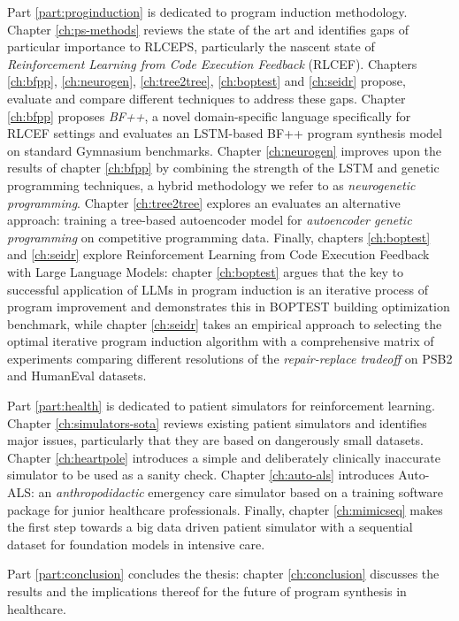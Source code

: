 Part \ref{part:proginduction} is dedicated to program induction methodology.
Chapter \ref{ch:ps-methods} reviews the state of the art and identifies gaps of particular importance to RLCEPS, particularly the nascent state of \emph{Reinforcement Learning from Code Execution Feedback} (RLCEF).
Chapters \ref{ch:bfpp}, \ref{ch:neurogen}, \ref{ch:tree2tree}, \ref{ch:boptest} and \ref{ch:seidr} propose, evaluate and compare different techniques to address these gaps.
Chapter \ref{ch:bfpp} proposes \emph{BF++}, a novel domain-specific language specifically for RLCEF settings and evaluates an LSTM-based BF++ program synthesis model on standard Gymnasium \cite{towersGymnasiumStandardInterface2024} benchmarks.
Chapter \ref{ch:neurogen} improves upon the results of chapter \ref{ch:bfpp} by combining the strength of the LSTM and genetic programming techniques, a hybrid methodology we refer to as \emph{neurogenetic programming}.
Chapter \ref{ch:tree2tree} explores an evaluates an alternative approach: training a tree-based autoencoder model for \emph{autoencoder genetic programming} on competitive programming data.
Finally, chapters \ref{ch:boptest} and \ref{ch:seidr} explore Reinforcement Learning from Code Execution Feedback with Large Language Models: chapter \ref{ch:boptest} argues that the key to successful application of LLMs in program induction is an iterative process of program improvement and demonstrates this in BOPTEST building optimization benchmark, while chapter \ref{ch:seidr} takes an empirical approach to selecting the optimal iterative program induction algorithm with a comprehensive matrix of experiments comparing different resolutions of the \emph{repair-replace tradeoff} on PSB2 and HumanEval datasets.

Part \ref{part:health} is dedicated to patient simulators for reinforcement learning.
Chapter \ref{ch:simulators-sota} reviews existing patient simulators and identifies major issues, particularly that they are based on dangerously small datasets.
Chapter \ref{ch:heartpole} introduces a simple and deliberately clinically inaccurate simulator to be used as a sanity check.
Chapter \ref{ch:auto-als} introduces Auto-ALS: an \emph{anthropodidactic} emergency care simulator based on a training software package for junior healthcare professionals.
Finally, chapter \ref{ch:mimicseq} makes the first step towards a big data driven patient simulator with a sequential dataset for foundation models in intensive care.

Part \ref{part:conclusion} concludes the thesis: chapter \ref{ch:conclusion} discusses the results and the implications thereof for the future of program synthesis in healthcare.
